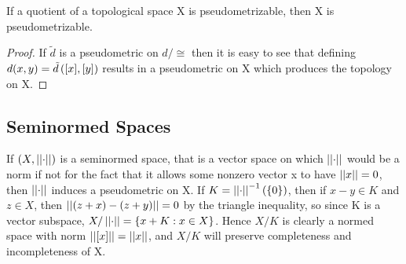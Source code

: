 












\begin{prop}
    \label{prop:pseudometrizableprequotient}
    If a quotient of a topological space X is pseudometrizable, then X is pseudometrizable.
    \begin{proof}
        If $\tilde{d}$ is a pseudometric on $d/\cong$ then it is easy to see that defining $d(x,y)=\tilde{d}\left( [x],[y]\right)$ results in a pseudometric on X which produces the topology on X. 
    \end{proof} 
\end{prop} 


\subsection{Seminormed Spaces}
If $(X,\left|\left| \cdot \right|\right|)$ is a seminormed space, that is a vector space on which $\left|\left| \cdot \right|\right|$ would be a norm if not for the fact that it allows some nonzero vector x to have $\left|\left| x \right|\right|=0$, then $\left|\left| \cdot \right|\right|$ induces a pseudometric on X. 
If $K=\left|\left| \cdot \right|\right|^{-1}(\{0\})$, then if $x-y \in K$ and $z \in X$, then $\left|\left| (z+x)-(z+y) \right|\right|=0$ by the triangle inequality, so since K is a vector subspace, $X/\left|\left| \cdot \right|\right|=\{x+K: x \in X\}$.
Hence $X/K$ is clearly a normed space with norm $\left|\left| [x] \right|\right| = \left|\left| x \right|\right|$, and $X/K$ will preserve completeness and incompleteness of X. 

